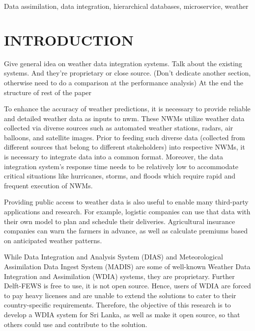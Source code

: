 \documentclass[conference]{IEEEtran}
\newcommand{\db}[1]{\textcolor{blue!40}{#1}}
\begin{document}
\begin{IEEEkeywords}
\db{Data assimilation, data integration, hierarchical databases, microservice, weather}
\end{IEEEkeywords}

\section{INTRODUCTION}
Give general idea on weather data integration systems.
Talk about the existing systems. And they're proprietary or close source.
(Don't dedicate another section, otherwise need to do a comparison at the performance analysis)
At the end the structure of rest of the paper

To enhance the accuracy of weather predictions, it is necessary to provide reliable and detailed weather data as inputs to \acrfull{nwm}. These NWMs utilize weather data collected via diverse sources such as automated weather stations, radars, air balloons, and satellite images. Prior to feeding such diverse data (collected from different sources that belong to different stakeholders) into respective NWMs, it is necessary to integrate data into a common format. Moreover, the data integration system’s response time needs to be relatively low to accommodate critical situations like hurricanes, storms, and floods which require rapid and frequent execution of NWMs.

Providing public access to weather data is also useful to enable many third-party applications and research. For example, logistic companies can use that data with their own model to plan and schedule their deliveries. Agricultural insurance companies can warn the farmers in advance, as well as calculate premiums based on anticipated weather patterns.

While Data Integration and Analysis System (DIAS) and Meteorological Assimilation Data Ingest System (MADIS) are some of well-known Weather Data Integration and Assimilation (WDIA) systems, they are proprietary. Further Delft-FEWS is free to use, it is not open source. Hence, users of WDIA are forced to pay heavy licenses and are unable to extend the solutions to cater to their country-specific requirements. Therefore, the objective of this research is to develop a WDIA system for Sri Lanka, as well as make it open source, so that others could use and contribute to the solution.
\end{document}
